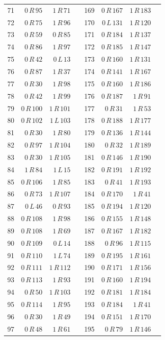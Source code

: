\begin{longtable}{rrrrrrrr}
71 & $0\,R\,95$ & $1\,R\,71$ & & 169 & $0\,R\,167$ & $1\,R\,183$ &\\
72 & $0\,R\,75$ & $1\,R\,96$ & & 170 & $0\,L\,131$ & $1\,R\,120$ &\\
73 & $0\,R\,59$ & $0\,R\,85$ & & 171 & $0\,R\,184$ & $1\,R\,137$ &\\
74 & $0\,R\,86$ & $1\,R\,97$ & & 172 & $0\,R\,185$ & $1\,R\,147$ &\\
75 & $0\,R\,42$ & $0\,L\,13$ & & 173 & $0\,R\,160$ & $1\,R\,131$ &\\
76 & $0\,R\,87$ & $1\,R\,37$ & & 174 & $0\,R\,141$ & $1\,R\,167$ &\\
77 & $0\,R\,30$ & $1\,R\,98$ & & 175 & $0\,R\,160$ & $1\,R\,186$ &\\
78 & $0\,R\,42$ & $1\,R\,99$ & & 176 & $0\,R\,187$ & $1\,R\,91$ &\\
79 & $0\,R\,100$ & $1\,R\,101$ & & 177 & $0\,R\,31$ & $1\,R\,53$ &\\
80 & $0\,R\,102$ & $1\,L\,103$ & & 178 & $0\,R\,188$ & $1\,R\,177$ &\\
81 & $0\,R\,30$ & $1\,R\,80$ & & 179 & $0\,R\,136$ & $1\,R\,144$ &\\
82 & $0\,R\,97$ & $1\,R\,104$ & & 180 & $0\,R\,32$ & $1\,R\,189$ &\\
83 & $0\,R\,30$ & $1\,R\,105$ & & 181 & $0\,R\,146$ & $1\,R\,190$ &\\
84 & $1\,R\,84$ & $1\,L\,15$ & & 182 & $0\,R\,191$ & $1\,R\,192$ &\\
85 & $0\,R\,106$ & $1\,R\,85$ & & 183 & $0\,R\,41$ & $1\,R\,193$ &\\
86 & $0\,R\,73$ & $1\,R\,107$ & & 184 & $0\,R\,170$ & $1\,R\,41$ &\\
87 & $0\,L\,46$ & $0\,R\,93$ & & 185 & $0\,R\,194$ & $1\,R\,120$ &\\
88 & $0\,R\,108$ & $1\,R\,98$ & & 186 & $0\,R\,155$ & $1\,R\,148$ &\\
89 & $0\,R\,108$ & $1\,R\,69$ & & 187 & $0\,R\,167$ & $1\,R\,182$ &\\
90 & $0\,R\,109$ & $0\,L\,14$ & & 188 & $0\,R\,96$ & $1\,R\,115$ &\\
91 & $0\,R\,110$ & $1\,L\,74$ & & 189 & $0\,R\,195$ & $1\,R\,161$ &\\
92 & $0\,R\,111$ & $1\,R\,112$ & & 190 & $0\,R\,171$ & $1\,R\,156$ &\\
93 & $0\,R\,113$ & $1\,R\,93$ & & 191 & $0\,R\,160$ & $1\,R\,194$ &\\
94 & $0\,R\,50$ & $1\,R\,103$ & & 192 & $0\,R\,181$ & $1\,R\,184$ &\\
95 & $0\,R\,114$ & $1\,R\,95$ & & 193 & $0\,R\,184$ & $1\,R\,41$ &\\
96 & $0\,R\,30$ & $1\,R\,49$ & & 194 & $0\,R\,151$ & $1\,R\,170$ &\\
97 & $0\,R\,48$ & $1\,R\,61$ & & 195 & $0\,R\,79$ & $1\,R\,146$ &\\
\bottomrule\end{longtable}
\normalsize
